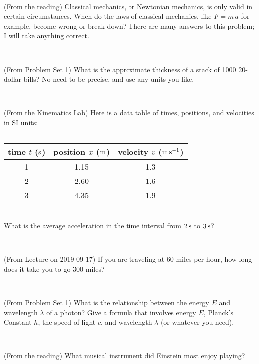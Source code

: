 \documentclass[12pt, letterpaper]{article}
\begin{document}
\vfill ~

\begin{problem} (From the reading)
Classical mechanics, or Newtonian mechanics, is only valid in certain
circumstances. When do the laws of classical mechanics, like $F =
m\,a$ for example, become wrong or break down? There are many answers
to this problem; I will take anything correct.
\end{problem}


\vfill ~

\begin{problem} (From Problem Set 1)
What is the approximate thickness of a stack of 1000 20-dollar bills?
No need to be precise, and use any units you like.
\end{problem}


\vfill ~


\clearpage


\begin{problem} (From the Kinematics Lab)
Here is a data table of times, positions, and velocities in SI units:\\
\rule{1.0in}{0pt}\begin{tabular}{c|c|c}
time $t$ ($\mathrm{s}$) & position $x$ ($\mathrm{m}$) & velocity $v$ ($\mathrm{m}\,\mathrm{s}^{-1}$) \\
\hline
1 & 1.15 & 1.3 \\
2 & 2.60 & 1.6 \\
3 & 4.35 & 1.9 \\
\hline
\end{tabular}\\
What is the average acceleration in the time interval from $2\,\mathrm{s}$ to $3\,\mathrm{s}$?
\end{problem}


\vfill ~

\begin{problem} (From Lecture on 2019-09-17)
If you are traveling at 60 miles per hour, how long does
it take you to go 300 miles?
\end{problem}


\vfill ~

\begin{problem} (From Problem Set 1)
What is the relationship between the energy $E$ and wavelength
$\lambda$ of a photon? Give a formula that involves energy $E$,
Planck's Constant $h$, the speed of light $c$, and wavelength
$\lambda$ (or whatever you need).
\end{problem}

\vfill ~

\begin{problem} (From the reading)
What musical instrument did Einstein most enjoy playing?
\end{problem}
\end{document}
